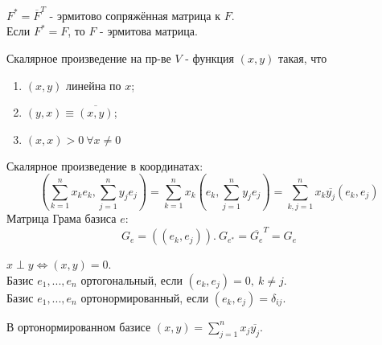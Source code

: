 \begin{definition}
    $F^* = \overline{F}^T$ - эрмитово сопряжённая матрица к $F$.\\
    Если $F^* = F$, то $F$ - эрмитова матрица.
\end{definition} 
\begin{definition}
    Скалярное произведение на пр-ве $V$ - функция $(x,y)$ такая, что
    \begin{enumerate}
        \item $(x,y)$ линейна по $x$;
        \item $(y,x) \equiv \overline{(x,y)}$;
        \item $(x,x) > 0 \ \forall x \neq 0$
    \end{enumerate}
\end{definition}
Скалярное произведение в координатах:
$$(\sum \limits_{k=1}^n x_ke_k, \sum \limits_{j=1}^n y_je_j) = \sum \limits_{k=1}^n x_k(e_k, \sum \limits_{j=1}^n y_je_j) = \sum \limits_{k, j=1}^n x_k\overline{y_j}(e_k, e_j)$$
Матрица Грама базиса $e$: 
$$G_e = ((e_k, e_j)). \ G_{e^*} = \overline{G_e}^T = G_e$$
\begin{definition}
    $x \perp y \Longleftrightarrow (x, y) = 0$.\\
    Базис $e_1,...,e_n$ ортогональный, если $(e_k, e_j) = 0, \ k \neq j$.\\
    Базис $e_1,...,e_n$ ортонормированный, если $(e_k, e_j) = \delta_{ij}$.
\end{definition}
В ортонормированном базисе $(x, y) = \sum \limits_{j=1}^n x_j\overline{y_j}$.

